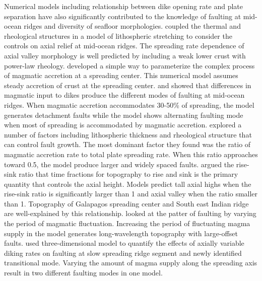 \documentclass[letterpaper,12pt,notitle]{memphisthesis}                     %
\begin{document}
Numerical models including relationship between dike opening rate and plate separation have also significantly contributed to the knowledge of faulting at mid-ocean ridges and diversity of seafloor morphologies. %
\citet{Chen1990} coupled the thermal and rheological structures in a model of lithospheric stretching to consider the controls on axial relief at mid-ocean ridges. The spreading rate dependence of axial valley morphology is well predicted by including a weak lower crust with power-law rheology. \citet{Buck1998} developed a simple way to parameterize the complex process of magmatic accretion at a spreading center. This numerical model assumes steady accretion of crust at the spreading center. \citet{Buck2005} and \citet{Tucholke2008} showed that differences in magmatic input to dikes produce the different modes of faulting at mid-ocean ridges. When magmatic accretion accommodates 30-50\% of spreading, the model generates detachment faults while the model shows alternating faulting mode when most of spreading is accommodated by magmatic accretion. 
\citet{Behn2008} explored a number of factors including lithospheric thickness and rheological structure that can control fault growth. The most dominant factor they found was the ratio of magmatic accretion rate to total plate spreading rate. When this ratio approaches toward 0.5, the model produce larger and widely spaced faults.
\citet{Ito2008} argued the rise-sink ratio that time fractions for topography to rise and sink is the primary quantity that controls the axial height. Models predict tall axial highs when the rise-sink ratio is significantly larger than 1 and axial valley when the ratio smaller than 1. Topography of Galapagos spreading center and South east Indian ridge are well-explained by this relationship.
\citet{Olive2015} looked at the patter of faulting by varying the period of magmatic fluctuation. Increasing the period of fluctuating magma supply in the model generates long-wavelength topography with large-offset faults.
\citet{Tian2017} used three-dimensional model to quantify the effects of axially variable diking rates on faulting at slow spreading ridge segment and newly identified transitional mode. Varying the amount of magma supply along the spreading axis result in two different faulting modes in one model.
\end{document}
